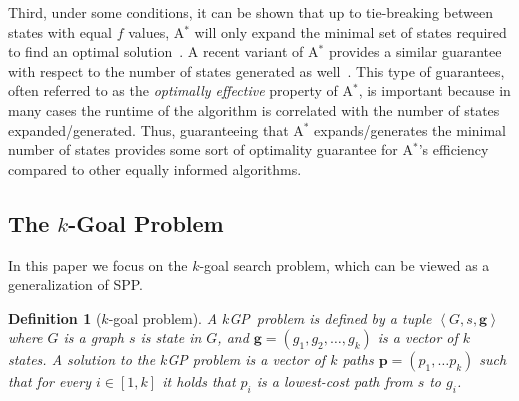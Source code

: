 \documentclass{aicom2e}
\newtheorem{definition}{Definition}
\newcommand{\kgs}{$k$GP}
\newcommand{\astar}{A$^*$}
\newcommand{\tuple}[1]{\ensuremath{\left \langle #1 \right \rangle }}
\newcommand{\roni}[1]{\textbf{[RS:#1]}}
\begin{document}

Third, under some conditions, it can be shown that up to tie-breaking between
states with equal $f$ values, \astar{} will only expand the minimal set of
states required to find an optimal
solution~\cite{dechter1985generalizedBestFirst}. A recent variant of \astar{}
provides a similar guarantee with respect to the number of states generated as
well~\cite{goldenberg2014enhanced}. This type of guarantees, often referred to
as the {\em optimally effective} property of \astar{}, is  important because in
many cases the runtime of the algorithm is correlated with the number of states
expanded/generated. Thus, guaranteeing that \astar{} expands/generates the
minimal number of states provides some sort of optimality guarantee for
\astar{}'s efficiency compared to other equally informed algorithms.


\subsection{The $k$-Goal Problem}

In this paper we focus on the $k$-goal search problem, which can be viewed as
a generalization of SPP.



\begin{definition}[$k$-goal problem]
A \kgs\ problem is defined by a tuple $\tuple{G,s, \textbf{g}}$ where $G$ is a
graph $s$ is state in $G$, and $\textbf{g}=(g_1,g_2,\ldots,g_k)$ is a vector of
$k$ states. A solution to the \kgs{} problem is a vector of $k$ paths
$\textbf{p}=(p_1,\ldots p_k)$ such that for every  $i\in [1,k]$ it holds that
$p_i$ is a lowest-cost path from $s$ to $g_i$. \label{def:k-goal}
\end{definition}
\end{document}
